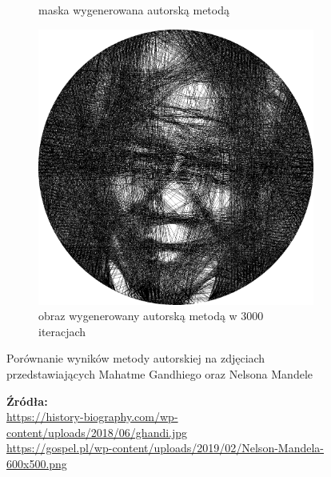 \documentclass[a4paper, 12pt, polish, twoside]{extreport}
\begin{document}
\begin{figure}[H]
\begin{subfigure}{0.24\textwidth}
        \caption{maska wygenerowana autorską metodą}
        \label{comp-comp-gandhi-mandela-g}
    \end{subfigure}
    \begin{subfigure}{0.24\textwidth}
        \centering
        \includegraphics[width = \textwidth]{img/6-comp/mandela_e_i3000_c15_inv0_bg5_obj1_ed1.png}
        \caption{obraz wygenerowany autorską metodą w 3000 iteracjach}
        \label{comp-comp-gandhi-mandela-h}
    \end{subfigure}
    \caption{Porównanie wyników metody autorskiej na zdjęciach przedstawiających Mahatme Gandhiego oraz Nelsona Mandele}
    \caption*{\footnotesize{\textbf{Źródła:}\\
    \url{https://history-biography.com/wp-content/uploads/2018/06/ghandi.jpg}\\
    {\url{https://gospel.pl/wp-content/uploads/2019/02/Nelson-Mandela-600x500.png}}}}
    \label{comp-comp-gandhi-mandela}
    \end{figure}
\end{document}
